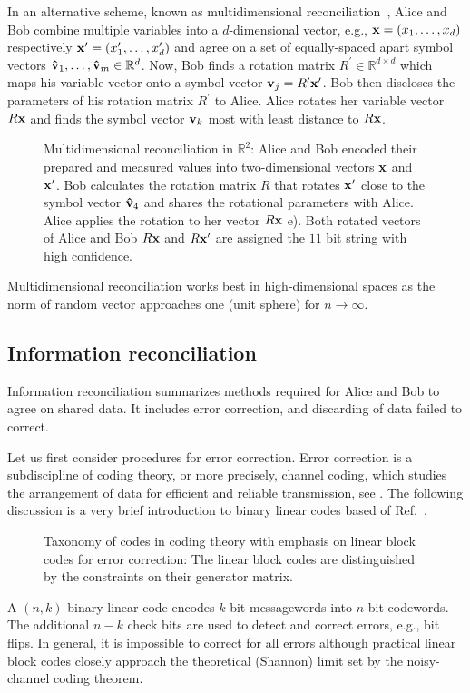 In an alternative scheme, known as multidimensional reconciliation~\cite{Leverrier2008}, Alice and Bob combine multiple variables into a $d$-dimensional vector, e.g., $\vb{x}=(x_1,\dots,x_d)$ respectively $\vb{x}^\prime=(x_1^\prime,\dots,x_d^\prime)$ and agree on a set of equally-spaced apart symbol vectors $\vu{v}_1,\dots,\vu{v}_m\in\mathbb{R}^d$.
Now, Bob finds a rotation matrix $R^\prime\in\mathbb{R}^{d\times d}$ which maps his variable vector onto a symbol vector $\vb{v}_j=R^\prime\vb{x}^\prime$.
Bob then discloses the parameters of his rotation matrix $R^\prime$ to Alice.
Alice rotates her variable vector $R\vb{x}$ and finds the symbol vector $\vb{v}_k$ most with least distance to $R\vb{x}$.
\begin{figure}[htb]
	\centering
	
	\caption{Multidimensional reconciliation in $\mathbb{R}^2$: Alice and Bob encoded their prepared and measured values into two-dimensional vectors $\vb{x}$ and $\vb{x}^\prime$. Bob calculates the rotation matrix $R$ that rotates $\vb{x}^\prime$ close to the symbol vector $\vu{v}_4$ and shares the rotational parameters with Alice. Alice applies the rotation to her vector $R\vb{x}$ e). Both rotated vectors of Alice and Bob $R\vb{x}$ and $R\vb{x}^\prime$ are assigned the $11$ bit string with high confidence.}\label{fig:multidimensional_reconciliation}
\end{figure}
Multidimensional reconciliation works best in high-dimensional spaces as the norm of random vector approaches one (unit sphere) for $n\to\infty$.

\FloatBarrier
\subsection{Information reconciliation}

Information reconciliation summarizes methods required for Alice and Bob to agree on shared data.
It includes error correction, and discarding of data failed to correct.

Let us first consider procedures for error correction.
Error correction is a subdiscipline of coding theory, or more precisely, channel coding, which studies the arrangement of data for efficient and reliable transmission, see .
The following discussion is a very brief introduction to binary linear codes based of Ref.~\cite{MacKay2003,Mildenberger2013}.
\begin{figure}[htb]
	\centering
	
	\caption{Taxonomy of codes in coding theory with emphasis on linear block codes for error correction: The linear block codes are distinguished by the constraints on their generator matrix.}\label{fig:error_correction_codes}
\end{figure}
A $(n,k)$ binary linear code encodes $k$-bit messagewords into $n$-bit codewords.
The additional $n-k$ check bits are used to detect and correct errors, e.g., bit flips.
In general, it is impossible to correct for all errors although practical linear block codes closely approach the theoretical (Shannon) limit set by the noisy-channel coding theorem.

